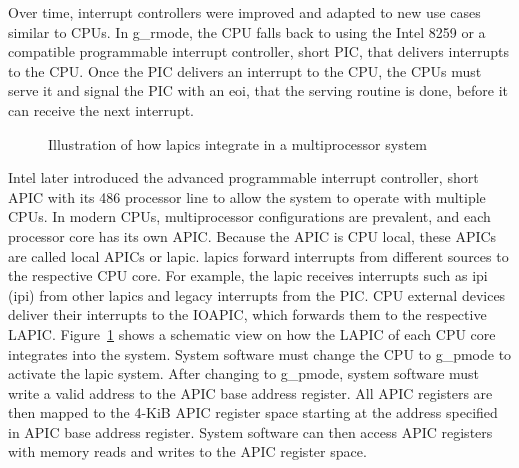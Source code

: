 Over time, interrupt controllers were improved and adapted to new use cases
similar to CPUs. In \gls{g_rmode}, the CPU falls back to using the Intel 8259 or a
compatible programmable interrupt controller, short PIC, that delivers
interrupts to the CPU. Once the PIC delivers an interrupt to the CPU, the CPUs
must serve it and signal the PIC with an \gls{eoi}, that
the serving routine is done, before it can receive the next interrupt. \\

\begin{figure}
    \begin{center}
        
        \caption{Illustration of how \glspl{lapic} integrate in a
            multiprocessor system}
        \label{fig:state:technical:lapic}
    \end{center}
\end{figure}

Intel later introduced the advanced programmable interrupt controller, short
APIC with its 486 processor line to allow the system to operate with multiple
CPUs. In modern CPUs, multiprocessor configurations are prevalent, and each
processor core has its own APIC. Because the APIC is CPU local, these APICs are
called local APICs or \gls{lapic}. \glspl{lapic}
forward interrupts from different sources to the respective CPU core. For
example, the \gls{lapic} receives interrupts such as \gls{ipi}
(\gls{ipi}) from other \glspl{lapic} and legacy interrupts from the
PIC. CPU external devices deliver their interrupts to the IOAPIC, which
forwards them to the respective LAPIC. Figure~\ref{fig:state:technical:lapic}
shows a schematic view on how the LAPIC of each CPU core integrates into the
system. System software must change the CPU to \gls{g_pmode} to activate the
\gls{lapic} system. After changing to \gls{g_pmode}, system software must
write a valid address to the APIC base address register. All APIC registers are
then mapped to the 4-KiB APIC register space starting at the address specified
in APIC base address register. System software can then access APIC registers
with memory reads and writes to the APIC register space.

